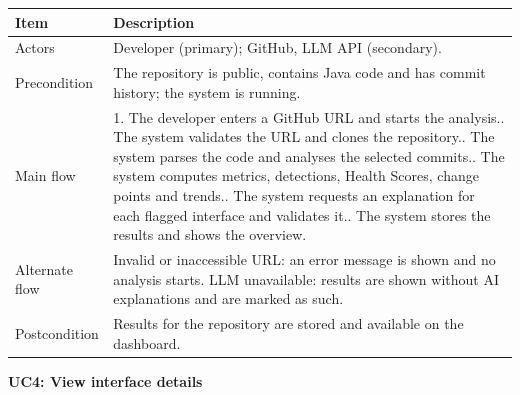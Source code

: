\documentclass[12pt,a4paper]{article}
\begin{document}
\begin{table}[H]
\centering
\renewcommand{\arraystretch}{1.5}
\setlength{\tabcolsep}{6pt}

\begin{tabular}{|L{1.5in}|L{3.85in}|}
\hline
\textbf{Item} & \textbf{Description} \\
\hline
Actors & Developer (primary); GitHub, LLM API (secondary). \\
\hline
Precondition & The repository is public, contains Java code and has commit history; the system is running. \\
\hline
Main flow & 1. The developer enters a GitHub URL and starts the analysis.. The system validates the URL and clones the repository.. The system parses the code and analyses the selected commits.. The system computes metrics, detections, Health Scores, change points and trends.. The system requests an explanation for each flagged interface and validates it.. The system stores the results and shows the overview. \\
\hline
Alternate flow & Invalid or inaccessible URL: an error message is shown and no analysis starts. LLM unavailable: results are shown without AI explanations and are marked as such. \\
\hline
Postcondition & Results for the repository are stored and available on the dashboard. \\
\hline
\end{tabular}
\end{table}

\begin{spacing}{1.5}
\justifying
\textbf{UC4: View interface details}
\end{spacing}
\end{document}
